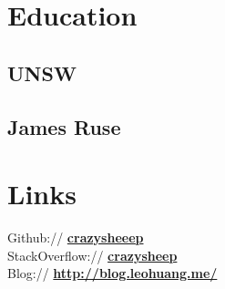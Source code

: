 \documentclass[letter]{deedy-resume} %
\begin{document}
\begin{minipage}[t]{0.33\textwidth} %


\section{Education} 

\subsection{UNSW}


\sectionspace %




\subsection{James Ruse}

\sectionspace %


\section{Links} 

Github:// \href{https://github.com/crazysheeep}{\bf crazysheeep} \\
StackOverflow:// \href{http://stackoverflow.com/users/3248882/crazysheep}{\bf crazysheep} \\
Blog:// \href{http://blog.leohuang.me/}{\bf http://blog.leohuang.me/}


\end{minipage}
\end{document}
